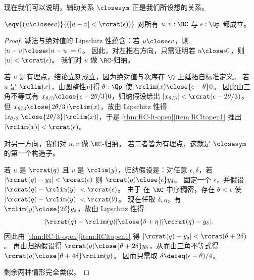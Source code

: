 现在我们可以说明，辅助关系 $\closesym$ 正是我们所设想的关系。

\begin{thm} \label{RC-sim-eqv-le}
  $\eqv{(u \close\epsilon v)}{(|u - v| < \rcrat(\epsilon))}$
  对所有 $u, v : \RC$ 与 $\epsilon : \Qp$ 都成立。
\end{thm}
\begin{proof}
  减法与绝对值的 Lipschitz 性蕴含：若 $u\close\epsilon v$，则 $|u-v| \close\epsilon |u-u| = 0$。
  因此，对左推右方向，只需证明若 $u\close\epsilon 0$，则 $|u|<\rcrat(\epsilon)$。
  我们对 $u$ 做 $\RC$-归纳。

  若 $u$ 是有理点，结论立刻成立，因为绝对值与次序在 $\Q$ 上延拓自标准定义。
  若 $u$ 是 $\rclim(x)$，由圆整性可得 $\theta:\Qp$ 使 $\rclim(x)\close{\epsilon-\theta} 0$。
  因此由三角不等式有 $x_{\theta/3} \close{\epsilon-2\theta/3} 0$，归纳假设给出 $|x_{\theta/3}|<\rcrat(\epsilon-2\theta/3)$。
  但 $x_{\theta/3} \close{2\theta/3} \rclim(x)$，故由 Lipschitz 性得 $|x_{\theta/3}| \close{2\theta/3} |\rclim(x)|$，于是 \cref{thm:RC-lt-open}\ref{item:RCltopen1} 推出 $|\rclim(x)|<\rcrat(\epsilon)$。

  对另一方向，我们对 $u,v$ 做 $\RC$-归纳。
  若二者皆为有理点，这就是 $\closesym$ 的第一个构造子。

  若 $u$ 是 $\rcrat(q)$ 且 $v$ 是 $\rclim(y)$，归纳假设是：对任意 $\epsilon,\delta$，若 $|\rcrat(q)-y_\delta|<\rcrat(\epsilon)$ 则 $\rcrat(q) \close{\epsilon} y_\delta$。
  固定一个 $\epsilon$，并假设 $|\rcrat(q) - \rclim(y)|<\rcrat(\epsilon)$。
  由于 \Q 在 $\RC$ 中序稠密，存在 $\theta<\epsilon$ 使 $|\rcrat(q) - \rclim(y)|<\rcrat(\theta)$。
  现在任取 $\delta,\eta$，有 $\rclim(y)\close{2\delta} y_\delta$，故由 Lipschitz 性得
  \[ |\rcrat(q) - \rclim(y)| \close{\delta+\eta} |\rcrat(q) - y_\delta|. \]
  因此由 \cref{thm:RC-lt-open}\ref{item:RCltopen1} 得 $|\rcrat(q) - y_\delta| < \rcrat(\theta+2\delta)$。
  再由归纳假设得 $\rcrat(q) \close{\theta+2\delta} y_\delta$，从而由三角不等式得 $\rcrat(q)\close{\theta+4\delta} \rclim(y)$。
  因而只需取 $\delta \defeq (\epsilon-\theta)/4$。

  剩余两种情形完全类似。
\end{proof}

